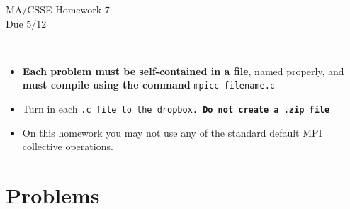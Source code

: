 \documentclass{article}
\begin{document}
\begin{center}
\Large{MA/CSSE Homework 7}\\
Due 5/12
\end{center}
\vspace{.25in}
\\
  \begin{itemize}
   \item \textbf{Each problem must be self-contained in a file}, named
     properly, and \textbf{must compile using the
      command} \texttt{mpicc filename.c}\\

  \item Turn in each \tt{.c} file to the dropbox. \textbf{Do not
      create a \tt{.zip} file}

  \item On this homework you may not use any of the standard default
    MPI collective operations. 
  \end{itemize}


\section*{Problems}
\end{document}
